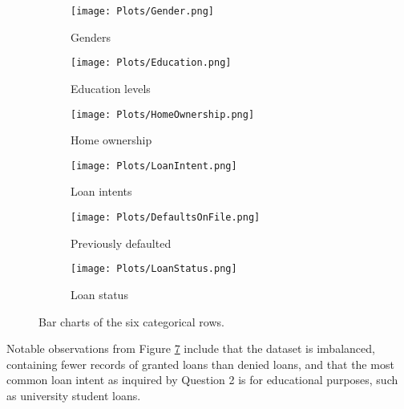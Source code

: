 \begin{figure}[H]
    \centering
    \begin{subfigure}[b]{0.3\textwidth}
        \centering
        \texttt{[image: Plots/Gender.png]}
        \caption{Genders}
        \label{fig:Bar1}
    \end{subfigure}
    \hfill
    \begin{subfigure}[b]{0.3\textwidth}
        \centering
        \texttt{[image: Plots/Education.png]}
        \caption{Education levels}
        \label{fig:Bar2}
    \end{subfigure}
    \hfill
    \begin{subfigure}[b]{0.3\textwidth}
        \centering
        \texttt{[image: Plots/HomeOwnership.png]}
        \caption{Home ownership}
        \label{fig:Bar3}
    \end{subfigure}
    
    \vspace{1em}
    
    \begin{subfigure}[b]{0.3\textwidth}
        \centering
        \texttt{[image: Plots/LoanIntent.png]}
        \caption{Loan intents}
        \label{fig:Bar4}
    \end{subfigure}
    \hfill
    \begin{subfigure}[b]{0.3\textwidth}
        \centering
        \texttt{[image: Plots/DefaultsOnFile.png]}
        \caption{Previously defaulted}
        \label{fig:Bar5}
    \end{subfigure}
    \hfill
    \begin{subfigure}[b]{0.3\textwidth}
        \centering
        \texttt{[image: Plots/LoanStatus.png]}
        \caption{Loan status}
        \label{fig:Bar6}
    \end{subfigure}
    \caption{Bar charts of the six categorical rows.}
    \label{fig:BarCharts}
\end{figure}

\para Notable observations from Figure \ref{fig:BarCharts} include that the dataset is imbalanced, containing fewer records of granted 
loans than denied loans, and that the most common loan intent as inquired by Question 2 is for 
educational purposes, such as university student loans.

